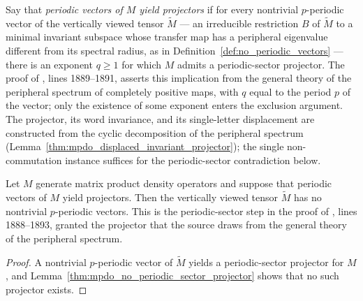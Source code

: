 \begin{definition}
    \label{def:mpdo_periodic_vector_yields_projector}
    \leanok
    Say that \emph{periodic vectors of $M$ yield projectors} if for every
    nontrivial $p$-periodic vector of the vertically viewed tensor
    $\widetilde M$ --- an irreducible restriction $B$ of $\widetilde M$ to a
    minimal invariant subspace whose transfer map has a peripheral
    eigenvalue different from its spectral radius, as in
    Definition~\ref{def:no_periodic_vectors} --- there is an exponent
    $q\ge 1$ for which $M$ admits a periodic-sector projector. The proof of
    \cite[Proposition~4.13]{Cirac2016MPDO_arXiv}, lines 1889--1891, asserts
    this implication from the general theory of the peripheral spectrum of
    completely positive maps, with $q$ equal to the period $p$ of the
    vector; only the existence of some exponent enters the exclusion
    argument. The projector, its word invariance, and its single-letter
    displacement are constructed from the cyclic decomposition of the
    peripheral spectrum
    (Lemma~\ref{thm:mpdo_displaced_invariant_projector}); the single
    non-commutation instance suffices for the periodic-sector contradiction
    below.
\end{definition}

\begin{theorem}
    \label{thm:mpdo_vertical_no_periodic_vectors}
    \leanok
    Let $M$ generate matrix product density operators and suppose that
    periodic vectors of $M$ yield projectors. Then the vertically viewed
    tensor $\widetilde M$ has no nontrivial $p$-periodic vectors. This is
    the periodic-sector step in the proof of
    \cite[Proposition~4.13]{Cirac2016MPDO_arXiv}, lines 1888--1893, granted
    the projector that the source draws from the general theory of the
    peripheral spectrum.
\end{theorem}

\begin{proof}
    \leanok
    A nontrivial $p$-periodic vector of $\widetilde M$ yields a
    periodic-sector projector for $M$, and
    Lemma~\ref{thm:mpdo_no_periodic_sector_projector} shows that no such
    projector exists.
\end{proof}

